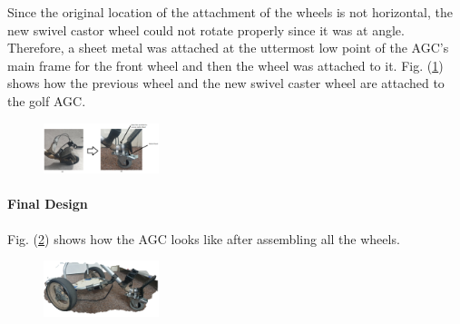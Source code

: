 \documentclass[11pt,landscape]{article}
\begin{document}
\begin{multicols}{3}
Since the original location of the attachment of the wheels is not horizontal,
the new swivel castor wheel could not rotate properly since it was at angle.
Therefore, a sheet metal was attached at the uttermost low point of the AGC's
main frame for the front wheel and then the wheel was attached to it. Fig.
(\ref{fig:new_front_wheels}) shows how the previous wheel and the new swivel
caster wheel are attached to the golf AGC.

\begin{figure}[H]
    \begin{center}
        \includegraphics[width=0.3\textwidth]{New front wheels.PNG}
        \label{fig:new_front_wheels}
    \end{center}
\end{figure}

\paragraph{Final Design}
Fig. (\ref{fig:final_wheels}) shows how the AGC looks like after assembling
all the wheels.

\begin{figure}[H]
    \begin{center}
        \includegraphics[width=0.3\textwidth]{Full wheels.PNG}
        \label{fig:final_wheels}
    \end{center}
\end{figure}





\end{multicols}
\end{document}
